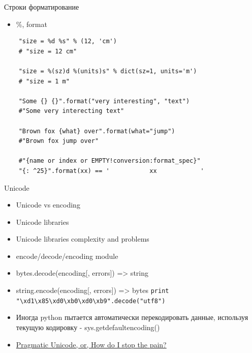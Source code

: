 \documentclass{article}
\begin{document}
\begin{center} Строки форматирование \end{center}
\begin{itemize}
	\item \%, format
\end{itemize}

\vspace{15pt}
\begin{lstlisting}
	"size = %d %s" % (12, 'cm') 
	# "size = 12 cm"

	"size = %(sz)d %(units)s" % dict(sz=1, units='m') 
	# "size = 1 m"

	"Some {} {}".format("very interesting", "text")
	#"Some very interecting text"

	"Brown fox {what} over".format(what="jump")
	#"Brown fox jump over"

	#"{name or index or EMPTY!conversion:format_spec}"
	"{: ^25}".format(xx) == '           xx            '
\end{lstlisting}
\newpage

\begin{center} Unicode \end{center}
\begin{itemize}
	\item Unicode vs encoding
	\item Unicode libraries
	\item Unicode libraries complexity and problems
	\item encode/decode/encoding module
	\item bytes.decode(encoding[, errors]) => string
	\item string.encode(encoding[, errors]) => bytes
	\lstinline!print "\xd1\x85\xd0\xb0\xd0\xb9".decode("utf8")!
	\item Иногда python пытается автоматически перекодировать 
			данные, используя текущую кодировку - sys.getdefaultencoding()
	\item \href{http://www.youtube.com/watch?feature=player_embedded&v=sgHbC6udIqc}
				{Pragmatic Unicode, or, How do I stop the pain?}
\end{itemize}
\newpage
\end{document}
